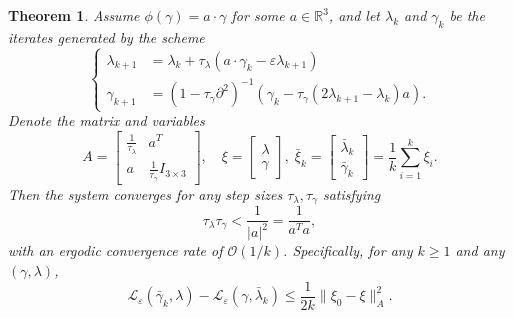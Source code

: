 \documentclass[10pt,a4paper]{amsart}
\newtheorem{theorem}{Theorem}
\newcommand{\R}{\mathbb{R}}
\begin{document}
\begin{theorem}
    Assume $\phi(\gamma) = a\cdot \gamma$ for some $a \in \R^3$, and let $\lambda_k$ and $\gamma_k$ be the iterates generated by the  scheme
    \[\begin{cases}
        \lambda_{k+1} & = \lambda_k + \tau_{\lambda}(a\cdot\gamma_k - \varepsilon\lambda_{k+1})\\
        \gamma_{k+1} &= (1-\tau_{\gamma}\partial^2)^{-1}(\gamma_k - \tau_{\gamma}(2\lambda_{k+1}-\lambda_k)a).
    \end{cases}\]
    Denote the matrix and variables 
    $$
    A = \begin{bmatrix}
    \frac{1}{\tau_{\lambda}} & a^T\\
    a & \frac{1}{\tau_{\gamma}}I_{3\times 3}
\end{bmatrix}, \quad \xi = \begin{bmatrix}
    \lambda\\ \gamma
\end{bmatrix}, \;  \bar{\xi}_k = \begin{bmatrix}
    \bar{\lambda}_k\\ \bar{\gamma}_k
\end{bmatrix} = \frac{1}{k}\sum_{i=1}^k \xi_i.
$$ 
Then the system converges for any step sizes $\tau_{\lambda}, \tau_{\gamma}$ satisfying  
\[
\tau_{\lambda}\tau_{\gamma} < \frac{1}{|a|^2} = \frac{1}{a^Ta},
\]
with an ergodic convergence rate of $\mathcal{O}(1/k)$. Specifically, for any $k\geq 1$ and any $(\gamma, \lambda)$, 
\[\mathcal{L}_{\varepsilon}(\bar{\gamma}_k, \lambda) - \mathcal{L}_{\varepsilon}(\gamma, \bar{\lambda}_k) \leq \frac{1}{2k}\|\xi_0 - \xi\|^2_A. \]
\end{theorem}
\end{document}
